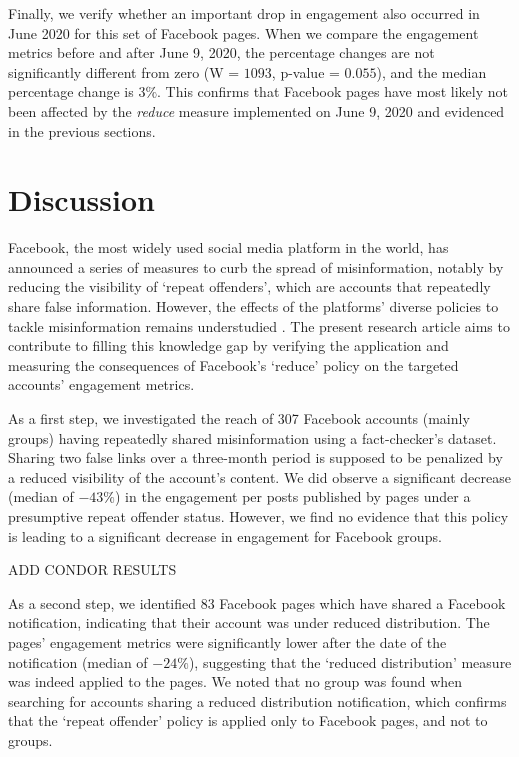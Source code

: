 \documentclass[review]{elsarticle}
\begin{document}
{Finally, we verify whether an important drop in engagement also occurred in June 2020 for this set of Facebook pages.
When we compare the engagement metrics before and after June 9, 2020, the percentage changes are not significantly different from zero (W = $1093$, p-value = $0.055$), and the median percentage change is $3\%$.
This confirms that Facebook pages have most likely not been affected by the {\it reduce} measure implemented on June 9, 2020 and evidenced in the previous sections.

\section{Discussion}

Facebook, the most widely used social media platform in the world, has announced a series of measures to curb the spread of misinformation, notably by reducing the visibility of `repeat offenders', which are accounts that repeatedly share false information. 
However, the effects of the platforms' diverse policies to tackle misinformation remains understudied \citep{pasquetto2020tackling}. 
The present research article aims to contribute to filling this knowledge gap by verifying the application and measuring the consequences of Facebook's `reduce' policy on the targeted accounts' engagement metrics.

As a first step, we investigated the reach of 307 Facebook accounts (mainly groups) having repeatedly shared misinformation using a fact-checker's dataset. 
Sharing two false links over a three-month period is supposed to be penalized by a reduced visibility of the account's content. 
We did observe a significant decrease (median of $-43\%$) in the engagement per posts published by pages under a presumptive repeat offender status.
However, we find no evidence that this policy is leading to a significant decrease in engagement for Facebook groups.

{\color{red} ADD CONDOR RESULTS}
 
As a second step, we identified 83 Facebook pages which have shared a Facebook notification, indicating that their account was under reduced distribution.
The pages' engagement metrics were significantly lower after the date of the notification (median of $-24\%$), suggesting that the `reduced distribution' measure was indeed applied to the pages.
We noted that no group was found when searching for accounts sharing a reduced distribution notification, which confirms that the `repeat offender' policy is applied only to Facebook pages, and not to groups.

}
\end{document}
